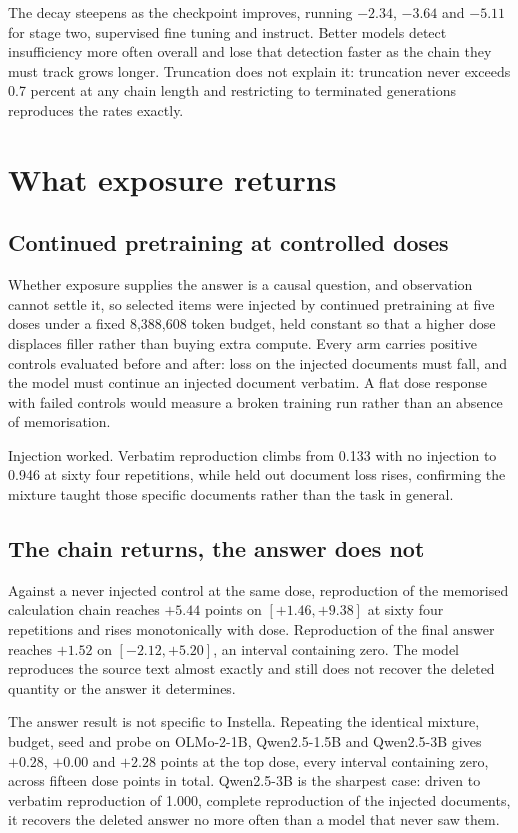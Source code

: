The decay steepens as the checkpoint improves, running $-2.34$, $-3.64$ and $-5.11$ for
stage two, supervised fine tuning and instruct. Better models detect insufficiency more often
overall and lose that detection faster as the chain they must track grows longer.
Truncation does not explain it: truncation never exceeds 0.7 percent at any chain length and
restricting to terminated generations reproduces the rates exactly.

\section{What exposure returns}

\subsection{Continued pretraining at controlled doses}

Whether exposure supplies the answer is a causal question, and observation cannot settle it,
so selected items were injected by continued pretraining at five doses under a fixed
8{,}388{,}608 token budget, held constant so that a higher dose displaces filler rather than
buying extra compute. Every arm carries positive controls evaluated before and after: loss on
the injected documents must fall, and the model must continue an injected document verbatim.
A flat dose response with failed controls would measure a broken training run rather than an
absence of memorisation.

Injection worked. Verbatim reproduction climbs from 0.133 with no injection to 0.946 at
sixty four repetitions, while held out document loss rises, confirming the mixture taught
those specific documents rather than the task in general.

\subsection{The chain returns, the answer does not}

Against a never injected control at the same dose, reproduction of the memorised calculation
chain reaches $+5.44$ points on $[+1.46, +9.38]$ at sixty four repetitions and rises
monotonically with dose. Reproduction of the final answer reaches $+1.52$ on
$[-2.12, +5.20]$, an interval containing zero. The model reproduces the source text almost
exactly and still does not recover the deleted quantity or the answer it determines.

The answer result is not specific to Instella. Repeating the identical mixture, budget, seed
and probe on OLMo-2-1B, Qwen2.5-1.5B and Qwen2.5-3B gives $+0.28$, $+0.00$ and $+2.28$
points at the top dose, every interval containing zero, across fifteen dose points in total.
Qwen2.5-3B is the sharpest case: driven to verbatim reproduction of 1.000, complete
reproduction of the injected documents, it recovers the deleted answer no more often than a
model that never saw them.

